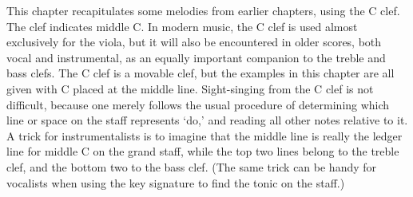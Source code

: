 \documentclass{sight}
\begin{document}
\pagebreak[3]\par
\vspace{5mm}\begin{samepage}This chapter recapitulates some melodies from earlier chapters, using the C clef. The clef indicates middle C. In modern music, the C clef is used almost exclusively for the viola, but it will also be encountered in older scores, both vocal and instrumental, as an equally important companion to the treble and bass clefs. The C clef is a movable clef, but the examples in this chapter are all given with C placed at the middle line. Sight-singing from the C clef is not difficult, because one merely follows the usual procedure of determining which line or space on the staff represents `do,' and reading all other notes relative to it. A trick for instrumentalists is to imagine that the middle line is really the ledger line for middle C on the grand staff, while the top two lines belong to the treble clef, and the bottom two to the bass clef. (The same trick can be handy for vocalists when using the key signature to find the tonic on the staff.)\\


\pagebreak[3]\par
{}%
\label{tune:412}%
{%
\parindent 0pt
\noindent
\ifx\preLilyPondExample \undefined
\else
  \expandafter\preLilyPondExample
\fi
\def\lilypondbook{}%

\ifx\postLilyPondExample \undefined
\else
  \expandafter\postLilyPondExample
\fi
}
\end{samepage}


\pagebreak[3]\par
\vspace{5mm}\begin{samepage}
%
\label{tune:413}%
{%
\parindent 0pt
\noindent
\ifx\preLilyPondExample \undefined
\else
  \expandafter\preLilyPondExample
\fi
\def\lilypondbook{}%

\ifx\postLilyPondExample \undefined
\else
  \expandafter\postLilyPondExample
\fi
}
\end{samepage}
\end{document}
